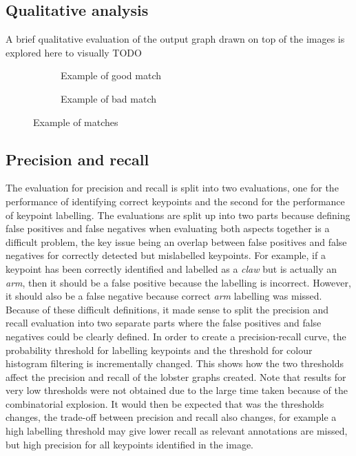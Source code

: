 \subsection{Qualitative analysis}
A brief qualitative evaluation of the output graph drawn on top of the images is explored here to visually TODO
\begin{figure}[H]

	\begin{subfigure}{0.45\textwidth}
	
	\caption{Example of good match}
	\end{subfigure}
	\hspace*{\fill}
	\begin{subfigure}{0.45\textwidth}
	
	\caption{Example of bad match}
	\end{subfigure}
\caption{Example of matches}
\end{figure}

\subsection{Precision and recall}
The evaluation for precision and recall is split into two evaluations, one for the performance of identifying correct keypoints and the second for the performance of keypoint labelling. The evaluations are split up into two parts because defining false positives and false negatives when evaluating both aspects together is a difficult problem, the key issue being an overlap between false positives and false negatives for correctly detected but mislabelled keypoints. For example, if a keypoint has been correctly identified and labelled as a \textit{claw} but is actually an \textit{arm}, then it should be a false positive because the labelling is incorrect. However, it should also be a false negative because correct \textit{arm} labelling was missed. Because of these difficult definitions, it made sense to split the precision and recall evaluation into two separate parts where the false positives and false negatives could be clearly defined.
\n
In order to create a precision-recall curve, the probability threshold for labelling keypoints and the threshold for colour histogram filtering is incrementally changed. This shows how the two thresholds affect the precision and recall of the lobster graphs created. Note that results for very low thresholds were not obtained due to the large time taken because of the combinatorial explosion. It would then be expected that was the thresholds changes, the trade-off between precision and recall also changes, for example a high labelling threshold may give lower recall as relevant annotations are missed, but high precision for all keypoints identified in the image.

